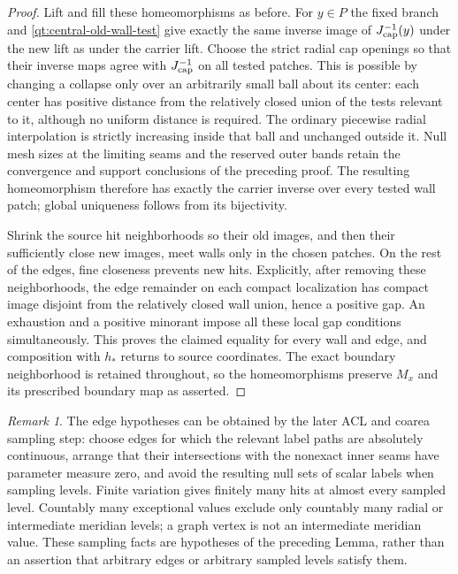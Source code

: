 \documentclass[11pt]{article}
\numberwithin{equation}{section}
\theoremstyle{definition}
\theoremstyle{remark}
\newtheorem{remark}[theorem]{Remark}
\begin{document}
\begin{proof}
Lift and fill these homeomorphisms as before.  For $y\in P$ the
fixed branch and \eqref{qt:central-old-wall-test} give exactly the
same inverse image of $J_{\rm cap}^{-1}(y)$ under the new lift as
under the carrier lift.  Choose the strict radial cap openings so
that their inverse maps agree with $J_{\rm cap}^{-1}$ on all tested
patches.  This is possible by changing a collapse only over an
arbitrarily small ball about its center: each center has positive
distance from the relatively closed union of the tests relevant
to it, although no uniform distance is required.  The ordinary
piecewise radial interpolation is strictly increasing inside that
ball and unchanged outside it.  Null mesh sizes at the limiting
seams and the reserved outer bands retain the convergence and
support conclusions of the preceding proof.  The resulting
homeomorphism therefore has exactly the carrier inverse over every
tested wall patch; global uniqueness follows from its bijectivity.

Shrink the source hit neighborhoods so their old images, and then
their sufficiently close new images, meet walls only in the chosen
patches.  On the rest of the edges, fine closeness prevents new
hits.  Explicitly, after removing these neighborhoods, the edge
remainder on each compact localization has compact image disjoint
from the relatively closed wall union, hence a positive gap.
An exhaustion and a positive minorant impose all these local gap
conditions simultaneously.  This proves the claimed equality for
every wall and edge, and composition with $h_*$ returns to source
coordinates.  The exact boundary neighborhood is retained throughout,
so the homeomorphisms preserve $M_x$ and its prescribed boundary
map as asserted.
\end{proof}

\begin{remark}
The edge hypotheses can be obtained by the later ACL and coarea
sampling step: choose edges for which the relevant label paths are
absolutely continuous, arrange that their intersections with the
nonexact inner seams have parameter measure zero, and avoid the
resulting null sets of scalar labels when sampling levels.  Finite
variation gives finitely many hits at almost every sampled level.
Countably many exceptional values exclude only countably many
radial or intermediate meridian levels; a graph vertex is not an
intermediate meridian value.  These sampling facts are hypotheses
of the preceding Lemma, rather than an assertion that arbitrary
edges or arbitrary sampled levels satisfy them.
\end{remark}
\end{document}
